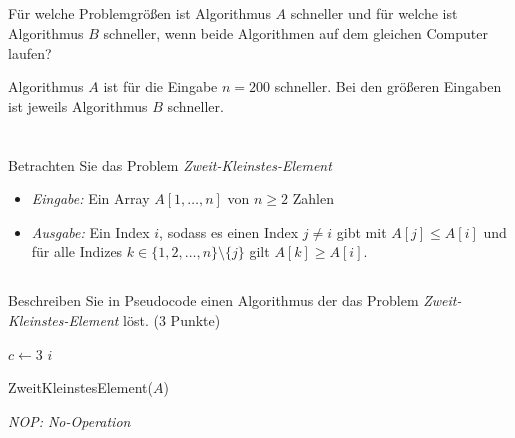 \documentclass[12pt]{article}
\theoremstyle{remark}
\begin{document}
\subsection{}

Für welche Problemgrößen ist Algorithmus $A$ schneller und für welche ist Algorithmus $B$ schneller, wenn beide Algorithmen auf dem gleichen Computer laufen?

Algorithmus $A$ ist für die Eingabe $n = 200$ schneller. Bei den größeren Eingaben ist jeweils Algorithmus $B$ schneller.  

\section{}

Betrachten Sie das Problem {\it Zweit-Kleinstes-Element}
\begin{itemize}
    \item {\it Eingabe:} Ein Array $A[1, \ldots, n]$ von $n \geq 2$ Zahlen
    
    \item {\it Ausgabe:} Ein Index $i$, sodass es einen Index $j \neq i$ gibt mit $A[j] \leq A[i]$ und für alle Indizes $k \in \{ 1, 2, \ldots , n \} \setminus \{ j \}$ gilt $A[k] \geq A[i]$.

\end{itemize}

\subsection{}

Beschreiben Sie in Pseudocode einen Algorithmus der das Problem {\it Zweit-Kleinstes-Element} löst. (3 Punkte) \\

\begin{algorithm}[H]
\SetAlgoLined
{}
 $c \gets 3$\;
 \Return $i$\;
\caption{ZweitKleinstesElement($A$)}
\end{algorithm}
\emph{NOP: No-Operation}
\end{document}

